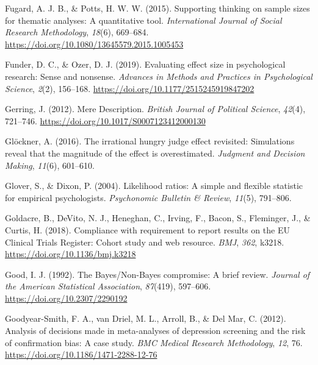 \documentclass[
  oneside]{krantz}
\newlength{\cslhangindent}
\newlength{\cslentryspacingunit} %
\newenvironment{CSLReferences}[2] %
 {%
  \setlength{\parindent}{0pt}
  \ifodd #1
  \let\oldpar\par
  \def\par{\hangindent=\cslhangindent\oldpar}
  \fi
  \setlength{\parskip}{#2\cslentryspacingunit}
 }%
 {}
\begin{document}
\begin{CSLReferences}{1}{0}
\leavevmode{}%
Fugard, A. J. B., \& Potts, H. W. W. (2015). Supporting thinking on
sample sizes for thematic analyses: A quantitative tool.
\emph{International Journal of Social Research Methodology},
\emph{18}(6), 669--684.
\url{https://doi.org/10.1080/13645579.2015.1005453}

\leavevmode{}%
Funder, D. C., \& Ozer, D. J. (2019). Evaluating effect size in
psychological research: {Sense} and nonsense. \emph{Advances in Methods
and Practices in Psychological Science}, \emph{2}(2), 156--168.
\url{https://doi.org/10.1177/2515245919847202}

\leavevmode{}%
Gerring, J. (2012). Mere {Description}. \emph{British Journal of
Political Science}, \emph{42}(4), 721--746.
\url{https://doi.org/10.1017/S0007123412000130}

\leavevmode{}%
Glöckner, A. (2016). The irrational hungry judge effect revisited:
{Simulations} reveal that the magnitude of the effect is overestimated.
\emph{Judgment and Decision Making}, \emph{11}(6), 601--610.

\leavevmode{}%
Glover, S., \& Dixon, P. (2004). Likelihood ratios: {A} simple and
flexible statistic for empirical psychologists. \emph{Psychonomic
Bulletin \& Review}, \emph{11}(5), 791--806.

\leavevmode{}%
Goldacre, B., DeVito, N. J., Heneghan, C., Irving, F., Bacon, S.,
Fleminger, J., \& Curtis, H. (2018). Compliance with requirement to
report results on the {EU Clinical Trials Register}: Cohort study and
web resource. \emph{BMJ}, \emph{362}, k3218.
\url{https://doi.org/10.1136/bmj.k3218}

\leavevmode{}%
Good, I. J. (1992). The {Bayes}/{Non-Bayes} compromise: {A} brief
review. \emph{Journal of the American Statistical Association},
\emph{87}(419), 597--606. \url{https://doi.org/10.2307/2290192}

\leavevmode{}%
Goodyear-Smith, F. A., van Driel, M. L., Arroll, B., \& Del Mar, C.
(2012). Analysis of decisions made in meta-analyses of depression
screening and the risk of confirmation bias: {A} case study. \emph{BMC
Medical Research Methodology}, \emph{12}, 76.
\url{https://doi.org/10.1186/1471-2288-12-76}


\end{CSLReferences}
\end{document}
